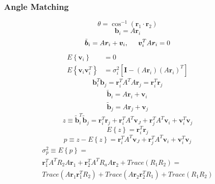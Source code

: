 \documentclass[12pt,a4paper,oneside]{article}
\begin{document}
\subsubsection{Angle Matching}
\cite{gottlieb1978star}
\begin{equation}
\theta = \cos^{-1}(\bm{r}_1 \cdot \bm{r}_2)
\end{equation}
\begin{equation}
\bm{b}_i = A\bm{r}_i
\end{equation}
\begin{equation}
\tilde{\bm{b}}_i = A\bm{r}_i + \bm{v}_i, \hspace{0.5cm} \bm{v}_i^TA\bm{r}_i = 0
\end{equation}
\begin{subequations}
\begin{align*}
E\left\{\bm{v}_i\right\} &= 0 \\
E\left\{\bm{v}_i\bm{v}_i^T\right\} &= \sigma_i^2 [\bm{I} - (A\bm{r}_i)(A\bm{r}_i)^T]
\end{align*}
\end{subequations}
\begin{equation}
\bm{b}_i^T\bm{b}_j = \bm{r}_i^TA^TA\bm{r}_j = \bm{r}_i^T\bm{r}_j
\end{equation}
\begin{subequations}
\begin{align*}
\tilde{\bm{b}}_i = A\bm{r}_i + \bm{v}_i\\
\tilde{\bm{b}}_j = A\bm{r}_j + \bm{v}_j
\end{align*}
\end{subequations}
\begin{equation}
z \equiv \tilde{\bm{b}}_i^T\tilde{\bm{b}}_j = \bm{r}_i^T\bm{r}_j + \bm{r}_i^TA^T\bm{v}_J + \bm{r}_j^TA^T\bm{v}_i + \bm{v}_i^T\bm{v}_j
\end{equation}
\begin{equation}
E\left\{z\right\} = \bm{r}_i^T\bm{r}_j
\end{equation}
\begin{equation}
p \equiv z - E\left\{z\right\} = \bm{r}_i^TA^T\bm{v}_J + \bm{r}_j^TA^T\bm{v}_i + \bm{v}_i^T\bm{v}_j
\end{equation}
\begin{equation}
\begin{split}
\sigma_p^2 \equiv E\left\{p\right\} = \\
\bm{r}_1^TA^TR_2A\bm{r}_1 + \bm{r}_2^TA^TR_aA\bm{r}_2 + Trace(R_1R_2) = \\
Trace(A\bm{r}_1\bm{r}_1^TR_2) + Trace(A\bm{r}_2\bm{r}_2^TR_1) + Trace(R_1R_2)
\end{split}
\end{equation}
\end{document}
